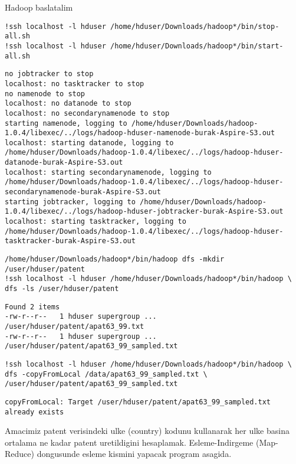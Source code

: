 \documentclass[12pt,fleqn]{article}\usepackage{../common}
\begin{document}
Hadoop baslatalim

\begin{verbatim}
!ssh localhost -l hduser /home/hduser/Downloads/hadoop*/bin/stop-all.sh
!ssh localhost -l hduser /home/hduser/Downloads/hadoop*/bin/start-all.sh
\end{verbatim}

\begin{verbatim}
no jobtracker to stop
localhost: no tasktracker to stop
no namenode to stop
localhost: no datanode to stop
localhost: no secondarynamenode to stop
starting namenode, logging to /home/hduser/Downloads/hadoop-1.0.4/libexec/../logs/hadoop-hduser-namenode-burak-Aspire-S3.out
localhost: starting datanode, logging to /home/hduser/Downloads/hadoop-1.0.4/libexec/../logs/hadoop-hduser-datanode-burak-Aspire-S3.out
localhost: starting secondarynamenode, logging to /home/hduser/Downloads/hadoop-1.0.4/libexec/../logs/hadoop-hduser-secondarynamenode-burak-Aspire-S3.out
starting jobtracker, logging to /home/hduser/Downloads/hadoop-1.0.4/libexec/../logs/hadoop-hduser-jobtracker-burak-Aspire-S3.out
localhost: starting tasktracker, logging to /home/hduser/Downloads/hadoop-1.0.4/libexec/../logs/hadoop-hduser-tasktracker-burak-Aspire-S3.out
\end{verbatim}

\begin{verbatim}
/home/hduser/Downloads/hadoop*/bin/hadoop dfs -mkdir /user/hduser/patent
!ssh localhost -l hduser /home/hduser/Downloads/hadoop*/bin/hadoop \
dfs -ls /user/hduser/patent
\end{verbatim}

\begin{verbatim}
Found 2 items
-rw-r--r--   1 hduser supergroup ...  /user/hduser/patent/apat63_99.txt
-rw-r--r--   1 hduser supergroup ...   /user/hduser/patent/apat63_99_sampled.txt
\end{verbatim}

\begin{verbatim}
!ssh localhost -l hduser /home/hduser/Downloads/hadoop*/bin/hadoop \
dfs -copyFromLocal /data/apat63_99_sampled.txt \
/user/hduser/patent/apat63_99_sampled.txt
\end{verbatim}

\begin{verbatim}
copyFromLocal: Target /user/hduser/patent/apat63_99_sampled.txt already exists
\end{verbatim}

Amacimiz patent verisindeki ulke (country) kodunu kullanarak her ulke
basina ortalama ne kadar patent uretildigini
hesaplamak. Esleme-Indirgeme (Map-Reduce) dongusunde esleme kismini
yapacak program asagida.
\end{document}
